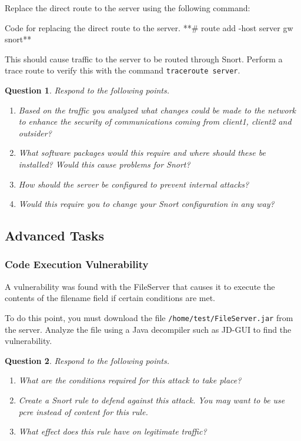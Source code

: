 \documentclass[a4paper,11pt,hidelinks]{article}
\newtheorem{theorem}{Question}[subsection]
\begin{document}
Replace the direct route to the server using the following command:

\begin{code}{Code for replacing the direct route to the server.}
**# route add -host server gw snort**
\end{code}

This should cause traffic to the server to be routed through Snort. Perform a trace route to verify this with the command \verb=traceroute server=.

\begin{theorem}
    Respond to the following points.
    \begin{enumerate}
        \item Based on the traffic you analyzed what changes could be made to the network to enhance the security of communications coming from client1, client2 and outsider?
        \item What software packages would this require and where should these be installed? Would this cause problems for Snort?
        \item How should the server be configured to prevent internal attacks?
        \item Would this require you to change your Snort configuration in any way?
    \end{enumerate}
\end{theorem}

\clearpage
\newpage

\subsection{Advanced Tasks}
\subsubsection{Code Execution Vulnerability}

A vulnerability was found with the FileServer that causes it to execute the contents of the filename field if certain conditions are met.

To do this point, you must download the file \verb=/home/test/FileServer.jar= from the server. Analyze the file using a Java decompiler such as JD-GUI to find the vulnerability.

\begin{theorem}
    Respond to the following points.
    \begin{enumerate}
        \item What are the conditions required for this attack to take place?
        \item Create a Snort rule to defend against this attack. You may want to be use pcre instead of content for this rule.
        \item What effect does this rule have on legitimate traffic?
    \end{enumerate}
\end{theorem}
\end{document}
